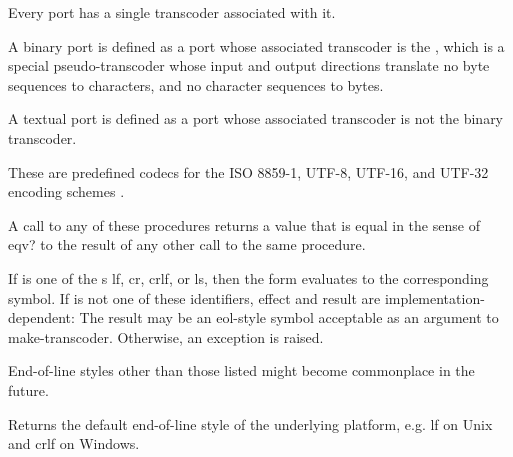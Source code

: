 Every port has a single transcoder associated with it.

A binary port is defined as a port whose associated transcoder
is the , which is a special
pseudo-transcoder whose input and output directions translate
no byte sequences to characters, and no character sequences to
bytes.

A textual port is defined as a port whose associated transcoder
is not the binary transcoder.

\begin{entry}{%
}

These are predefined codecs for the ISO 8859-1, UTF-8,
UTF-16, and UTF-32 encoding schemes \cite{Unicode}.

A call to any of these procedures returns a value that is equal in the
sense of {\cf eqv?} to the result of any other call to the same
procedure.
\end{entry}

\begin{entry}{%
}

If  is one of the s {\cf lf}, {\cf cr},
{\cf crlf}, or {\cf ls}, then the form evaluates to the corresponding
symbol.  If  is not one of these identifiers, effect and
result are implementation-dependent: The result may be an
eol-style symbol acceptable as an 
argument to {\cf make-transcoder}.  Otherwise, an exception is raised.

\begin{rationale}
  End-of-line styles other than those listed might become commonplace
  in the future.
\end{rationale}
\end{entry}

\begin{entry}{%
}

Returns the default end-of-line style of the underlying platform, e.g.
{\cf lf} on Unix and {\cf crlf} on Windows.
\end{entry}

